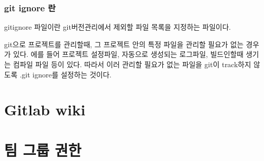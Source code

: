 \documentclass[12pt, a4paper, oneside]{book}
\let\stdsection\section
\renewcommand\section{\newpage\stdsection}
\begin{document}
	\noptcrule
	\minitoc
				

%										
	\section{git ignore 란}


		gitignore 파일이란 git버전관리에서 제외할 파일 목록을 지정하는 파일이다.

git으로 프로젝트를 관리할때, 그 프로젝트 안의 특정 파일을 관리할 필요가 없는 경우가 있다.
에를 들어 프로젝트 설정파일, 자동으로 생성되는 로그파일, 빌드인할때 생기는 컴파일 파일 등이 있다.
따라서 이러 관리할 필요가 없는 파일을 git이 track하지 않도록 .git ignore를 설정하는 것이다.











	\part 	{Gitlab wiki}


	\noptcrule
	\parttoc	
	\minitoc
				





	\part 	{팀 그룹 권한 }
	\noptcrule
	\parttoc				

			





\end{document}
